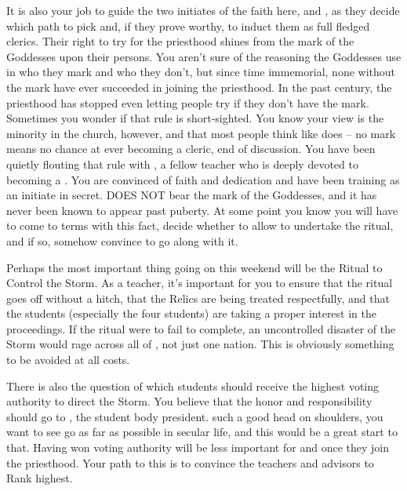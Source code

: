 \documentclass[char]{GL2020}
\begin{document}
It is also your job to guide the two initiates of the faith here, \cInitiate{} and \cWarlordDaughter{}, as they decide which path to pick and, if they prove worthy, to induct them as full fledged clerics. Their right to try for the priesthood shines from the mark of the Goddesses upon their persons. You aren't sure of the reasoning the Goddesses use in who they mark and who they don't, but since time immemorial, none without the mark have ever succeeded in joining the priesthood. In the past century, the priesthood has stopped even letting people try if they don't have the mark. Sometimes you wonder if that rule is short-sighted. You know your view is the minority in the church, however, and that most people think like \cEbbPriest{} does -- no mark means no chance at ever becoming a cleric, end of discussion. You have been quietly flouting that rule with \cPirate{\full}, a fellow teacher who is deeply devoted to becoming a \cPirate{\cleric}. You are convinced of \cPirate{\their} faith and dedication and have been training \cPirate{\them} as an initiate in secret. \cPirate{} DOES NOT bear the mark of the Goddesses, and it has never been known to appear past puberty. At some point you know you will have to come to terms with this fact, decide whether to allow \cPirate{\them} to undertake the ritual, and if so, somehow convince \cEbbPriest{} to go along with it.

Perhaps the most important thing going on this weekend will be the Ritual to Control the Storm. As a teacher, it's important for you to ensure that the ritual goes off without a hitch, that the Relics are being treated respectfully, and that the students (especially the four \pShip{} students) are taking a proper interest in the proceedings. If the ritual were to fail to complete, an uncontrolled disaster of the Storm would rage across all of \pEarth{}, not just one nation. This is obviously something to be avoided at all costs. 

There is also the question of which students should receive the highest voting authority to direct the Storm. You believe that the honor and responsibility should go to \cPresident{\full}, the student body president. \cPresident{\They} \cPresident{\have} such a good head on \cPresident{\their} shoulders, you want to see \cPresident{\them} go as far as possible in secular life, and this would be a great start to that. Having won voting authority will be less important for \cInitiate{} and \cWarlordDaughter{} once they join the priesthood. Your path to this is to convince the \pFarm{} teachers and \pShip{} advisors to Rank \cPresident{} highest.
\end{document}
